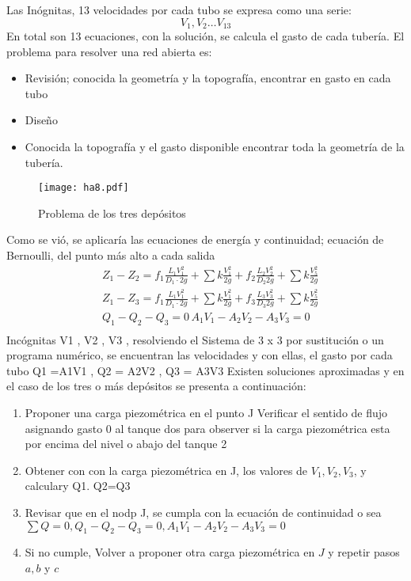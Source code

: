 Las Inógnitas, 13 velocidades por cada tubo se expresa como una serie:
\begin{equation*}
    V_1,V_2\dots V_{13}
\end{equation*}
En total son 13 ecuaciones, con la solución, se calcula el gasto de cada tubería.
El problema para resolver una red abierta es:
\begin{itemize}
    \item Revisión; conocida la geometría y la topografía, encontrar en gasto en cada tubo
    \item Diseño
    \item Conocida la topografía y el gasto disponible encontrar toda la geometría de la tubería.    
\end{itemize}
\begin{figure}[h!]
\centering
  \texttt{[image: ha8.pdf]}
  \caption{Problema de los tres depósitos}
  \label{ha8}
\end{figure}
Como se vió, se aplicaría las ecuaciones de energía y continuidad; ecuación de Bernoulli, del punto más alto a cada salida
\begin{align*}
    &Z_1 - Z_2 = f_1\frac{L_1V_1^2}{D_1\cdot 2g} + \sum k\frac{V_1^2}{2g} + f_2\frac{L_2V_2^2}{D_2 2g} + \sum k\frac{V_5^2}{2g}\\
    &Z_1 - Z_3 = f_1\frac{L_1V_1^2}{D_1\cdot 2g} + \sum k\frac{V_1^2}{2g} + f_3\frac{L_3V_3^2}{D_3 2g} + \sum k\frac{V_5^2}{2g}\\
    &Q_1 - Q_2 - Q_3 = 0\, A_1V_1 - A_2V_2 - A_3V_3 =0\\
\end{align*}
Incógnitas V1 , V2 , V3 , resolviendo el Sistema de 3 x 3 por sustitución o un programa
numérico, se encuentran las velocidades y con ellas, el gasto por cada tubo Q1 =A1V1 ,
Q2 = A2V2 , Q3 = A3V3
Existen soluciones aproximadas y en el caso de los tres o más depósitos se presenta a
continuación:
\begin{enumerate}
    \item Proponer una carga piezométrica en el punto J Verificar el sentido de flujo asignando gasto 0 al tanque dos para observer si la carga piezométrica esta por encima del nivel o abajo del tanque 2
    \item Obtener con con la carga piezométrica en J, los valores de $V_1, V_2, V_3$, y calculary Q1. Q2=Q3
    \item Revisar que en el nodp J, se cumpla con la ecuación de continuidad o sea $\sum Q= 0, Q_1-Q_2-Q_3=0, A_1V_1-A_2V_2-A_3V_3 =0$
    \item Si no cumple, Volver a proponer otra carga piezométrica en $J$ y repetir pasos $a, b$ y $c$
\end{enumerate}

